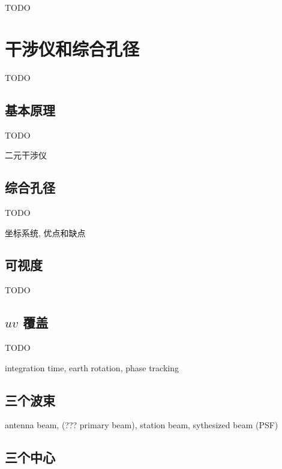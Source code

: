 TODO


\section{干涉仪和综合孔径}
\label{sec:interferometer}

TODO

\subsection{基本原理}

TODO

二元干涉仪

\subsection{综合孔径}

TODO

坐标系统, 优点和缺点

\subsection{可视度}

TODO

\subsection{\texorpdfstring{$uv$}{uv} 覆盖}

TODO

integration time, earth rotation, phase tracking

\subsection{三个波束}

antenna beam, (??? primary beam), station beam, sythesized beam (PSF)

\subsection{三个中心}

